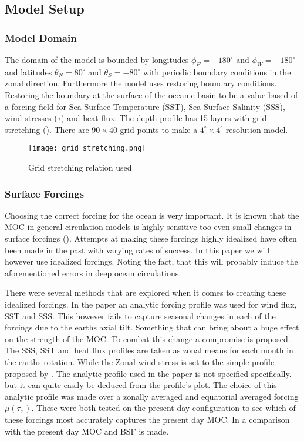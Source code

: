 
\subsection{Model Setup}
\subsubsection{Model Domain}
The domain of the model is bounded by longitudes $\phi_E=-180^{\circ}$ and $\phi_W=-180^{\circ}$ and latitudes $\theta_N=80^{\circ}$ and $\theta_S=-80^{\circ}$ with periodic boundary conditions in the zonal direction.
Furthermore the model uses restoring boundary conditions. Restoring the boundary at the surface of the oceanic basin to be a value based of a forcing field for Sea Surface Temperature (SST), Sea Surface Salinity (SSS), wind stresses ($\tau$) and heat flux.
 The depth profile has 15 layers with grid stretching (). There are $90 \times 40$ grid points to make a $4^{\circ} \times 4^{\circ}$ resolution model.
 
 \begin{figure}[H]
 	\texttt{[image: grid\_stretching.png]}
 	\caption{Grid stretching relation used}
 	\label{fig:gridstrech}
 \end{figure}

\subsubsection{Surface Forcings}
 Choosing the correct forcing for the ocean is very important. It is known that the MOC in general circulation models is highly sensitive too even small changes in surface forcings (\cite{Milliff1999May}). Attempts at making these forcings highly idealized have often been made in the past with varying rates of success. In this paper we will however use idealized forcings. Noting the fact, that this will probably induce the aforementioned errors in deep ocean circulations.
 
 There were several methods that are explored when it comes to creating these idealized forcings. In the \cite{Mulder2017Jul} paper an analytic forcing profile was used for wind flux, SST and SSS. This however fails to capture seasonal changes in each of the forcings due to the earths axial tilt. Something that can bring about a huge effect on the strength of the MOC. To combat this change a compromise is proposed. The SSS, SST and heat flux profiles are taken as zonal means for each month in the earths rotation. While the Zonal wind stress is set to the simple profile proposed by \cite{bryan1987parameter}. The analytic profile used in the paper is not specified specifically. but it can quite easily be deduced from the profile's plot. The choice of this analytic profile was made over a zonally averaged and equatorial averaged forcing $\mu(\tau_x)$. These were both tested on the present day configuration to see which of these forcings most accurately captures the present day MOC. In  a comparison with the present day MOC and BSF is made. 
 
